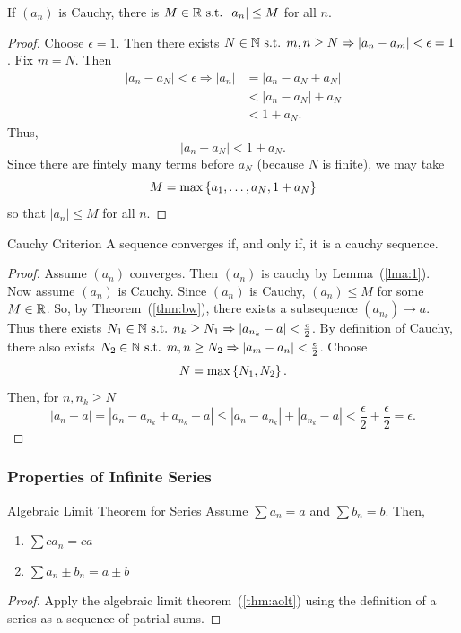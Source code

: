 \begin{lma}{}
    If $(a_n)$ is Cauchy, there is $M \in \mathbb R \text{ s.t. } |a_n| \leq M$ for all $n$.
    \begin{proof}
        Choose $\epsilon = 1$. Then there exists $N \in \mathbb N \text{ s.t. } m, n \geq N \Rightarrow |a_n - a_m| < \epsilon = 1$. Fix $m = N$. Then 
        \begin{align*}
            |a_n - a_N| < \epsilon \Rightarrow |a_n| &= |a_n - a_N + a_N| \\
            &< |a_n - a_N| + a_N \\
            &< 1 + a_N.
        \end{align*}
        Thus, 
        \[
            |a_n - a_N| < 1 + a_N .
        \]
        Since there are fintely many terms before $a_N$ (because $N$ is finite), we may take 
        \[
            M = \max\left\{a_1, \ldots, a_N, 1 + a_N \right\} 
        \]
        so that $|a_n| \leq M$ for all $n$.
    \end{proof}
\end{lma}

\begin{thm}{Cauchy Criterion}
    A sequence converges if, and only if, it is a cauchy sequence.
    \begin{proof}
        Assume $(a_n)$ converges. Then $(a_n)$ is cauchy by Lemma~(\ref{lma:1}). \\ Now assume $(a_n)$ is Cauchy. Since $(a_n)$ is Cauchy, $(a_n) \leq M$ for some $M \in \mathbb R$. So, by Theorem~(\ref{thm:bw}), there exists a subsequence $(a_{n_{k}}) \to a$. Thus there exists $N_1 \in \mathbb N \text{ s.t. } n_k \geq N_1 \Rightarrow |a_{n_{k}} - a| < \frac{\epsilon}{2}$. By definition of Cauchy, there also exists $N_2 \in \mathbb N \text{ s.t. } m, n \geq N_2 \Rightarrow |a_m - a_n| < \frac{\epsilon}{2}$. Choose
        \[
            N = \max\left\{N_1, N_2 \right\}.
        \]
        Then, for $n, n_k \geq N$ 
        \[
            |a_n - a| = |a_n - a_{n_{k}} + a_{n_{k}} + a| \leq |a_n - a_{n_{k}}| + |a_{n_{k}} - a| < \frac{\epsilon}{2} + \frac{\epsilon}{2} = \epsilon.
        \]
    \end{proof}
\end{thm}

\subsubsection{Properties of Infinite Series}
\begin{thm}{Algebraic Limit Theorem for Series}
    Assume $\sum a_n = a$ and $\sum b_n = b$. Then, 
    \begin{enumerate}
        \item $\sum c a_n = ca$
        \item $\sum a_n \pm b_n = a \pm b$ 
    \end{enumerate}
    \begin{proof}
        Apply the algebraic limit theorem~(\ref{thm:aolt}) using the definition of a series as a sequence of patrial sums.
    \end{proof}
\end{thm}

